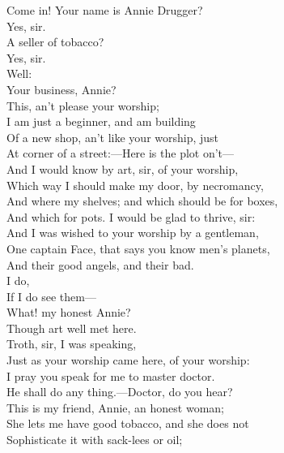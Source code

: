 \documentclass[a4paper,oneside,12pt]{memoir}
\begin{document}
\begin{drama*}
\subtlespeaks Come in! Your name is Annie Drugger?\\
\druggerspeaks {} Yes, sir.\\
\subtlespeaks A seller of tobacco?\\
\druggerspeaks {} Yes, sir.\\
\subtlespeaks {} Well:\\
Your business, Annie?\\
\druggerspeaks {} This, an't please your worship;\\
I am just a beginner, and am building\\
Of a new shop, an't like your worship, just\\
At corner of a street:---Here is the plot on't---\\
And I would know by art, sir, of your worship,\\
Which way I should make my door, by necromancy,\\
And where my shelves; and which should be for boxes,\\
And which for pots. I would be glad to thrive, sir:\\
And I was wished to your worship by a gentleman,\\
One captain Face, that says you know men's planets,\\
And their good angels, and their bad.\\
\subtlespeaks {} I do,\\
If I do see them---\\
\facespeaks {} What! my honest Annie?\\
Though art well met here.\\
\druggerspeaks {} Troth, sir, I was speaking,\\
Just as your worship came here, of your worship:\\
I pray you speak for me to master doctor.\\
\facespeaks He shall do any thing.---Doctor, do you hear?\\
This is my friend, Annie, an honest woman;\\
She lets me have good tobacco, and she does not\\
Sophisticate it with sack-lees or oil;\\

\end{drama*}
\end{document}
